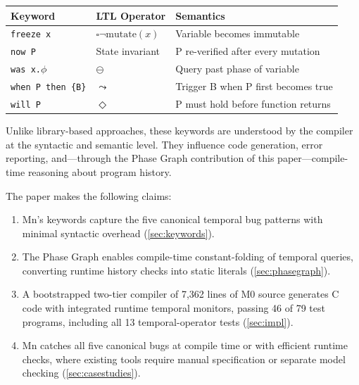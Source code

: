 \documentclass[11pt,a4paper]{article}
\begin{document}
\medskip
\begin{center}
\begin{tabular}{@{}lll@{}}
\toprule
\textbf{Keyword} & \textbf{LTL Operator} & \textbf{Semantics}\\
\midrule
\texttt{freeze x}          & $\square\neg\mathrm{mutate}(x)$ & Variable becomes immutable\\
\texttt{now P}             & State invariant              & P re-verified after every mutation\\
\texttt{was x.$\phi$}      & $\ominus$                    & Query past phase of variable\\
\texttt{when P then \{B\}} & $\leadsto$                   & Trigger B when P first becomes true\\
\texttt{will P}            & $\Diamond$                   & P must hold before function returns\\
\bottomrule
\end{tabular}
\end{center}
\medskip

Unlike library-based approaches, these keywords are understood by the compiler at the syntactic
and semantic level. They influence code generation, error reporting, and---through the Phase
Graph contribution of this paper---compile-time reasoning about program history.

The paper makes the following claims:
\begin{enumerate}[leftmargin=*,itemsep=2pt]
  \item Mn's keywords capture the five canonical temporal bug patterns with minimal syntactic
    overhead (\cref{sec:keywords}).
  \item The Phase Graph enables compile-time constant-folding of temporal queries, converting
    runtime history checks into static literals (\cref{sec:phasegraph}).
  \item A bootstrapped two-tier compiler of 7,362 lines of M0 source generates C code with
    integrated runtime temporal monitors, passing 46 of 79 test programs, including all 13 temporal-operator tests (\cref{sec:impl}).
  \item Mn catches all five canonical bugs at compile time or with efficient runtime checks,
    where existing tools require manual specification or separate model checking
    (\cref{sec:casestudies}).
\end{enumerate}

\end{document}
